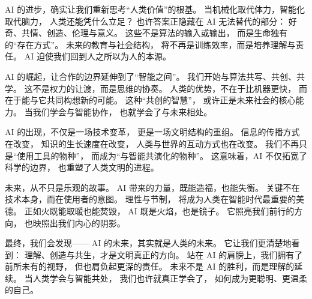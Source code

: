 AI 的进步，确实让我们重新思考“人类价值”的根基。  
当机械化取代体力，智能化取代脑力，  
人类还能凭什么立足？  
也许答案正隐藏在 AI 无法替代的部分：  
好奇、共情、创造、伦理与意义。  
这些不是算法的输入或输出，  
而是生命独有的“存在方式”。  
未来的教育与社会结构，  
将不再是训练效率，而是培养理解与责任。  
AI 迫使我们回到人之所以为人的本源。

AI 的崛起，让合作的边界延伸到了“智能之间”。  
我们开始与算法共写、共创、共学。  
这不是权力的让渡，而是思维的协奏。  
人类的优势，不在于比机器更快，  
而在于能与它共同构想新的可能。  
这种“共创的智慧”，  
或许正是未来社会的核心能力。  
当我们学会与智能协作，  
也就学会了与未来相处。

AI 的出现，不仅是一场技术变革，  
更是一场文明结构的重组。  
信息的传播方式在改变，  
知识的生长速度在改变，  
人类与世界的互动方式也在改变。  
我们不再只是“使用工具的物种”，  
而成为“与智能共演化的物种”。  
这意味着，AI 不仅拓宽了科学的边界，  
也重塑了人类文明的进程。

未来，从不只是乐观的故事。  
AI 带来的力量，既能造福，也能失衡。  
关键不在技术本身，而在使用者的意图。  
理性与节制，  
将成为人类在智能时代最重要的美德。  
正如火既能取暖也能焚毁，  
AI 既是火焰，也是镜子。  
它照亮我们前行的方向，  
也映照出我们内心的阴影。

最终，我们会发现——  
AI 的未来，其实就是人类的未来。  
它让我们更清楚地看到：  
理解、创造与共生，才是文明真正的方向。  
站在 AI 的肩膀上，我们拥有了前所未有的视野，  
但也肩负起更深的责任。  
未来不是 AI 的胜利，而是理解的延续。  
当人类学会与智能共处，  
我们也许就真正学会了，  
如何成为更聪明、更温柔的自己。










